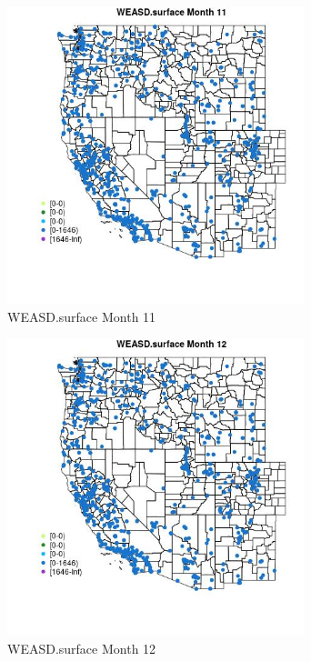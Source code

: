 \begin{figure} 
\centering  
\includegraphics[width=0.77\textwidth]{Code_Outputs/Report_ML_input_PM25_Step4_part_f_de_duplicated_aveswNAs_MapObsMo11WEASDsurface.jpg} 
\caption{\label{fig:Report_ML_input_PM25_Step4_part_f_de_duplicated_aveswNAsMapObsMo11WEASDsurface}WEASD.surface Month 11} 
\end{figure} 
 

\begin{figure} 
\centering  
\includegraphics[width=0.77\textwidth]{Code_Outputs/Report_ML_input_PM25_Step4_part_f_de_duplicated_aveswNAs_MapObsMo12WEASDsurface.jpg} 
\caption{\label{fig:Report_ML_input_PM25_Step4_part_f_de_duplicated_aveswNAsMapObsMo12WEASDsurface}WEASD.surface Month 12} 
\end{figure} 
 

